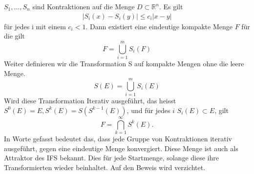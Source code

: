 $S_1,...,S_n$ sind Kontraktionen auf die Menge $D \subset \mathbb{R}^n$. Es gilt
\begin{align}
	|S_i(x) - S_i(y)| \leq c_i|x - y|
\end{align}
für jedes i mit einem $c_i < 1$. Dann existiert eine eindeutige kompakte Menge $F$ für die gilt
\begin{equation}
	F = \bigcup\limits_{i = 1}^{m} S_i(F)
\end{equation}
Weiter definieren wir die Transformation S auf kompakte Mengen ohne die leere Menge.
\begin{equation}
	S(E) = \bigcup\limits_{i = 1}^m S_i(E)
\end{equation}
Wird diese Transformation Iterativ ausgeführt, das heisst $S^0(E) = E, S^k(E) = S(S^{k-1}(E))$, und für jedes $i$ $S_i(E) \subset E$, gilt
\begin{equation}
	F = \bigcap\limits_{k = 1}^{\infty} S^k(E).
\end{equation}
In Worte gefasst bedeutet das, dass jede Gruppe von Kontraktionen iterativ ausgeführt, gegen eine eindeutige Menge konvergiert.
Diese Menge ist auch als Attraktor des IFS bekannt.
Dies für jede Startmenge, solange diese ihre Transformierten wieder beinhaltet.
Auf den Beweis wird verzichtet.
